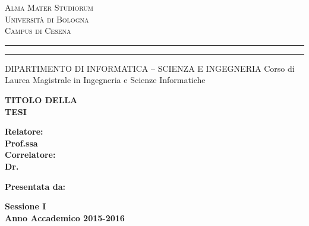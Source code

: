
\oddsidemargin=25pt

\begin{titlepage}
\begin{center}
{{\Large{\textsc{Alma Mater Studiorum}}}\\
{\Large{\textsc{Universit\`a di Bologna}}} \\
{\textsc{Campus di Cesena}} \rule[0.1cm]{14cm}{0.1mm}
		\rule[0.5cm]{14cm}{0.6mm}
DIPARTIMENTO DI INFORMATICA – SCIENZA E INGEGNERIA
Corso di Laurea Magistrale in Ingegneria e Scienze Informatiche }
\end{center}
\vspace{15mm}
\begin{center}
{\LARGE{\bf TITOLO DELLA}}\\
\vspace{3mm}
{\LARGE{\bf TESI}}\\
\end{center}
\vspace{40mm}
\par
\noindent
\begin{minipage}[t]{0.47\textwidth}
{\large{\bf Relatore:\\
Prof.ssa \xsupervisor}}
\vspace{5mm}
{\large{\bf \\Correlatore:\\
Dr. \xcorrelatore}}
\end{minipage}
\hfill
\begin{minipage}[t]{0.47\textwidth}\raggedleft
{\large{\bf Presentata da:\\
\xstudent}}
\end{minipage}
\vspace{20mm}
\begin{center}
{\large{\bf Sessione I\\%
Anno Accademico 2015-2016}}%
\end{center}
\end{titlepage}